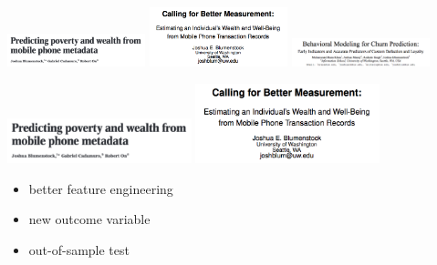 \documentclass[aspectratio=169]{beamer}
\begin{document}
\begin{frame}

\begin{center}
\includegraphics[width=0.3\textwidth]{figures/blumenstock_predicting_2015_title}
\includegraphics[width=0.3\textwidth]{figures/blumenstock_calling_2014_title}
\includegraphics[width=0.3\textwidth]{figures/khan_behavioral_2015_title}
\end{center}

\end{frame}
\begin{frame}

\begin{center}
\includegraphics[width=0.4\textwidth]{figures/blumenstock_predicting_2015_title}
\includegraphics[width=0.4\textwidth]{figures/blumenstock_calling_2014_title}
\end{center}

\pause
\begin{itemize}
\item better feature engineering
\item new outcome variable
\item out-of-sample test
\end{itemize}

\end{frame}
\end{document}
